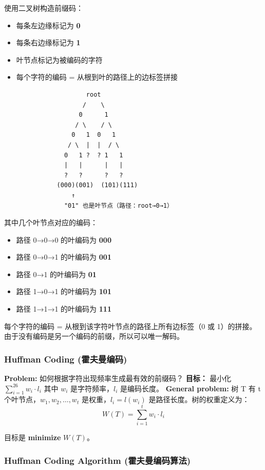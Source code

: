 \documentclass[10pt,a4paper,openany]{ctexbook}
\theoremstyle{definition}
\theoremstyle{remark}
\begin{document}
使用二叉树构造前缀码：
\begin{itemize}
\item 每条左边缘标记为 \textbf{0}
\item 每条右边缘标记为 \textbf{1}
\item 叶节点标记为被编码的字符
\item 每个字符的编码 = 从根到叶的路径上的边标签拼接

{\footnotesize\begin{verbatim}
                   root
                  /    \
                 0      1
                / \    / \
               0   1  0   1
              / \  |  |  / \
             0   1 ?  ? 1   1
             |   |      |   |
             ?   ?      ?   ?
           (000)(001)  (101)(111)
               ↑
             "01" 也是叶节点（路径：root→0→1）
\end{verbatim}}


\end{itemize}

其中几个叶节点对应的编码：
\begin{itemize}
\item 路径 0→0→0 的叶编码为 \textbf{000}
\item 路径 0→0→1 的叶编码为 \textbf{001}
\item 路径 0→1 的叶编码为 \textbf{01}
\item 路径 1→0→1 的叶编码为 \textbf{101}
\item 路径 1→1→1 的叶编码为 \textbf{111}

\end{itemize}

每个字符的编码 = 从根到该字符叶节点的路径上所有边标签（0 或 1）的拼接。由于没有编码是另一个编码的前缀，所以可以唯一解码。
\subsubsection{Huffman Coding (霍夫曼编码)}

\textbf{Problem:} 如何根据字符出现频率生成最有效的前缀码？
\textbf{目标：} 最小化 $\sum_{i=1}^{26} w_i \cdot l_i$
其中 $w_i$ 是字符频率，$l_i$ 是编码长度。
\textbf{General problem:} 树 T 有 t 个叶节点，$w_1, w_2, \ldots, w_t$ 是权重，$l_i = l(w_i)$ 是路径长度。树的权重定义为：
\[
W(T) = \sum_{i=1}^{t} w_i \cdot l_i
\]

目标是 \textbf{minimize} $W(T)$。
\subsubsection{Huffman Coding Algorithm (霍夫曼编码算法)}
\end{document}
